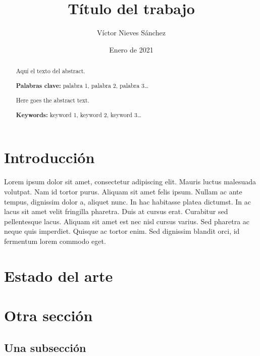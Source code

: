 \documentclass[a4paper, 12pt]{article} %
\author{Víctor Nieves Sánchez}
\date{Enero de 2021}
\title{Título del trabajo}
\begin{document}
\maketitle
\null
\newpage

\tableofcontents
\newpage

\listoffigures
\listoftables
\newpage

\begin{abstract}
  \normalsize
  Aquí el texto del abstract.

  \textbf{Palabras clave:} palabra 1, palabra 2, palabra 3\ldots
\end{abstract}

\begin{otherlanguage}{english}
  \begin{abstract}
    \normalsize
    Here goes the abstract text.

    \textbf{Keywords:} keyword 1, keyword 2, keyword 3\ldots
  \end{abstract}
\end{otherlanguage}

\newpage
{} %

\section{Introducción}

Lorem ipsum dolor sit amet, consectetur adipiscing elit. Mauris luctus malesuada
volutpat. Nam id tortor purus. Aliquam sit amet felis ipsum. Nullam ac ante
tempus, dignissim dolor a, aliquet nunc. In hac habitasse platea dictumst. In ac
lacus sit amet velit fringilla pharetra. Duis at cursus erat. Curabitur sed
pellentesque lacus. Aliquam sit amet est nec nisl cursus varius. Sed pharetra ac
neque quis imperdiet. Quisque ac tortor enim. Sed dignissim blandit orci, id
fermentum lorem commodo eget\cite{Recos}.

\section{Estado del arte}

\section{Otra sección}

\subsection{Una subsección}
\end{document}
